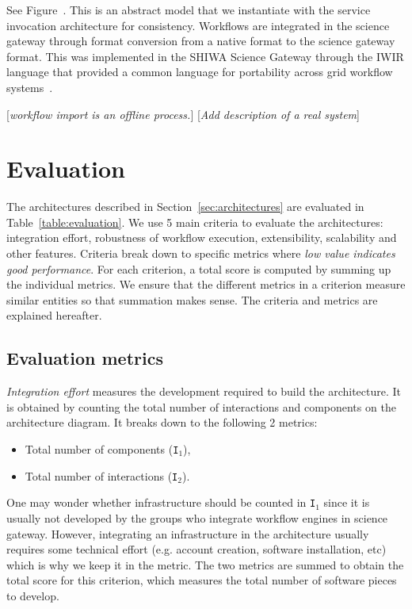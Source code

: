 \documentclass[preprint,3p,twocolumn]{elsarticle}
\newcommand{\todo}[1]{\color{blue}\xspace[\emph{#1}]\xspace\color{black}}
\begin{document}
See Figure~. This is an abstract model that we
instantiate with the service invocation architecture for
consistency. Workflows are integrated in the science gateway through
format conversion from a native format to the science gateway
format. This was implemented in the SHIWA Science Gateway through
the IWIR language that provided a common language for portability
across grid workflow
systems~\cite{plankensteiner-prodan-etal:2013}.

\todo{workflow import is an offline process.}
\todo{Add description of a real system}

\section{Evaluation}

\label{sec:evaluation}

The architectures described in Section~\ref{sec:architectures} are
evaluated in Table~\ref{table:evaluation}. We use 5 main criteria to
evaluate the architectures: integration effort, robustness of workflow
execution, extensibility, scalability and other features. Criteria
break down to specific metrics where \emph{low value indicates good
  performance}. For each criterion, a total score is computed by
summing up the individual metrics. We ensure that the different
metrics in a criterion measure similar entities so that summation
makes sense. The
criteria and metrics are explained hereafter.

\subsection{Evaluation metrics}

\emph{Integration effort} measures the development required to build
the architecture. It is obtained by counting the total number of
interactions and components on the architecture diagram. It breaks
down to the following 2 metrics:
\begin{itemize}[leftmargin=0cm,itemindent=0.35cm,itemsep=0cm]
\item Total number of components (\texttt{I$_1$}),
\item Total number of interactions (\texttt{I$_2$}).
\end{itemize}
One may wonder whether infrastructure should be counted in
\texttt{I$_1$} since it is usually not developed by the groups who
integrate workflow engines in science gateway. However, integrating an
infrastructure in the architecture usually requires some technical
effort (e.g. account creation, software installation, etc) which is
why we keep it in the metric. The two metrics are summed to obtain the
total score for this criterion, which measures the total number of
software pieces to develop.
\end{document}
